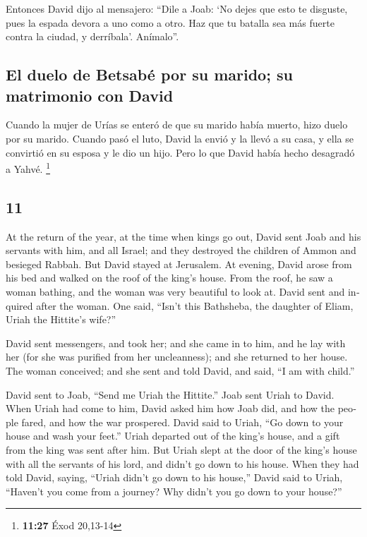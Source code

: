 \begin{paracol}{2}
 Entonces David dijo al mensajero: ``Dile a Joab: `No
dejes que esto te disguste, pues la espada devora a uno como a otro. Haz
que tu batalla sea más fuerte contra la ciudad, y derríbala'. Anímalo''.

\hypertarget{el-duelo-de-betsabuxe9-por-su-marido-su-matrimonio-con-david}{%
\subsection{El duelo de Betsabé por su marido; su matrimonio con
David}\label{el-duelo-de-betsabuxe9-por-su-marido-su-matrimonio-con-david}}

 Cuando la mujer de Urías se enteró de que su marido
había muerto, hizo duelo por su marido.  Cuando pasó el
luto, David la envió y la llevó a su casa, y ella se convirtió en su
esposa y le dio un hijo. Pero lo que David había hecho desagradó a
Yahvé. \footnote{\textbf{11:27} Éxod 20,13-14}

\switchcolumn
\begin{otherlanguage}{english}

\hypertarget{section-21}{%
\section{11}\label{section-21}}

 At the return of the year, at the time when kings go out,
David sent Joab and his servants with him, and all Israel; and they
destroyed the children of Ammon and besieged Rabbah. But David stayed at
Jerusalem.  At evening, David arose from his bed and
walked on the roof of the king's house. From the roof, he saw a woman
bathing, and the woman was very beautiful to look at. 
David sent and inquired after the woman. One said, ``Isn't this
Bathsheba, the daughter of Eliam, Uriah the Hittite's wife?''

 David sent messengers, and took her; and she came in to
him, and he lay with her (for she was purified from her uncleanness);
and she returned to her house.  The woman conceived; and
she sent and told David, and said, ``I am with child.''

 David sent to Joab, ``Send me Uriah the Hittite.'' Joab
sent Uriah to David.  When Uriah had come to him, David
asked him how Joab did, and how the people fared, and how the war
prospered.  David said to Uriah, ``Go down to your house
and wash your feet.'' Uriah departed out of the king's house, and a gift
from the king was sent after him.  But Uriah slept at the
door of the king's house with all the servants of his lord, and didn't
go down to his house.  When they had told David, saying,
``Uriah didn't go down to his house,'' David said to Uriah, ``Haven't
you come from a journey? Why didn't you go down to your house?''


\end{otherlanguage}
\end{paracol}
